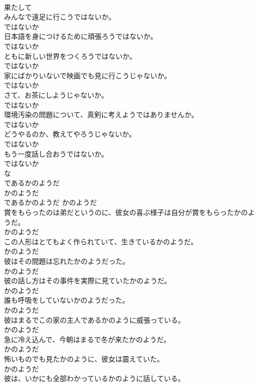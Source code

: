 \documentclass[8pt]{extreport}
\begin{document}
\begin{CJK}{UTF8}{min}
\\	果たして
\\	みんなで遠足に行こうではないか。	
\\	ではないか
\\	日本語を身につけるために頑張ろうではないか。	
\\	ではないか
\\	ともに新しい世界をつくろうではないか。	
\\	ではないか
\\	家にばかりいないで映画でも見に行こうじゃないか。	
\\	ではないか
\\	さて、お茶にしようじゃないか。	
\\	ではないか
\\	環境汚染の問題について、真剣に考えようではありませんか。	
\\	ではないか
\\	どうやるのか、教えてやろうじゃないか。	
\\	ではないか
\\	もう一度話し合おうではないか。	
\\	ではないか
\\	な
\\	であるかのようだ	
\\	かのようだ	
\\	であるかのようだ	かのようだ
\\	賞をもらったのは弟だというのに、彼女の喜ぶ様子は自分が賞をもらったかのようだ。	
\\	かのようだ
\\	この人形はとてもよく作られていて、生きているかのようだ。	
\\	かのようだ
\\	彼はその間題は忘れたかのようだった。	
\\	かのようだ
\\	彼の話し方はその事件を実際に見ていたかのようだ。	
\\	かのようだ
\\	誰も呼吸をしていないかのようだった。	
\\	かのようだ
\\	彼はまるでこの家の主人であるかのように威張っている。	
\\	かのようだ
\\	急に冷え込んで、今朝はまるで冬が来たかのようだ。	
\\	かのようだ
\\	怖いものでも見たかのように、彼女は震えていた。	
\\	かのようだ
\\	彼は、いかにも全部わかっているかのように話している。	

\end{CJK}
\end{document}
